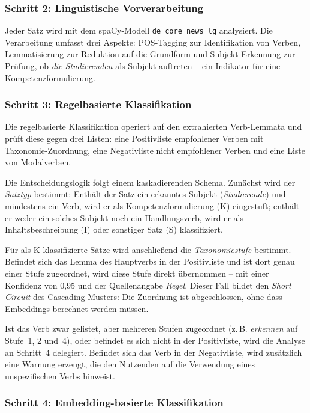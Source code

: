 \subsubsection{Schritt 2: Linguistische Vorverarbeitung}\label{sec:spacy-analyse}

Jeder Satz wird mit dem spaCy-Modell \texttt{de\_core\_news\_lg} analysiert.
Die Verarbeitung umfasst drei Aspekte: POS-Tagging zur Identifikation von Verben, Lemmatisierung zur Reduktion auf die Grundform und Subjekt-Erkennung zur Prüfung, ob \emph{die Studierenden} als Subjekt auftreten -- ein Indikator für eine Kompetenzformulierung.

\subsubsection{Schritt 3: Regelbasierte Klassifikation}\label{sec:regelbasiert}

Die regelbasierte Klassifikation operiert auf den extrahierten Verb-Lemmata und prüft diese gegen drei Listen: eine Positivliste empfohlener Verben mit Taxonomie-Zuordnung, eine Negativliste nicht empfohlener Verben und eine Liste von Modalverben.

Die Entscheidungslogik folgt einem kaskadierenden Schema.
Zunächst wird der \emph{Satztyp} bestimmt: Enthält der Satz ein erkanntes Subjekt (\emph{Studierende}) und mindestens ein Verb, wird er als Kompetenzformulierung (K) eingestuft; enthält er weder ein solches Subjekt noch ein Handlungsverb, wird er als Inhaltsbeschreibung (I) oder sonstiger Satz (S) klassifiziert.

Für als K klassifizierte Sätze wird anschließend die \emph{Taxonomiestufe} bestimmt.
Befindet sich das Lemma des Hauptverbs in der Positivliste und ist dort genau einer Stufe zugeordnet, wird diese Stufe direkt übernommen -- mit einer Konfidenz von 0{,}95 und der Quellenangabe \emph{Regel}.
Dieser Fall bildet den \emph{Short Circuit} des Cascading-Musters: Die Zuordnung ist abgeschlossen, ohne dass Embeddings berechnet werden müssen.

Ist das Verb zwar gelistet, aber mehreren Stufen zugeordnet (z.\,B. \emph{erkennen} auf Stufe~1, 2 und~4), oder befindet es sich nicht in der Positivliste, wird die Analyse an Schritt~4 delegiert.
Befindet sich das Verb in der Negativliste, wird zusätzlich eine Warnung erzeugt, die den Nutzenden auf die Verwendung eines unspezifischen Verbs hinweist.

\subsubsection{Schritt 4: Embedding-basierte Klassifikation}\label{sec:embedding-klassifikation}

